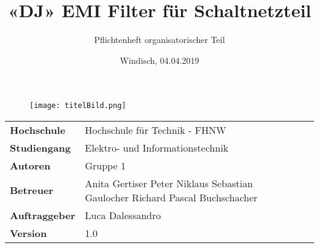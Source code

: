 \documentclass[final]{fhnwreport}       %
\title{«DJ» EMI Filter für Schaltnetzteil}          			%
\author{Pflichtenheft organisatorischer Teil}   %
\date{Windisch, 04.04.2019}             		%
\begin{document}
\maketitle

\vspace*{-1cm}						    %
\vfill
\begin{figure}[H]
\centering
\texttt{[image: titelBild.png]}
\end{figure}
\vfill

{
\renewcommand\arraystretch{2}
\begin{center}
\begin{tabular}{ >{\bf} l p{10cm} l }
Hochschule&Hochschule für Technik - FHNW\\
Studiengang&Elektro- und Informationstechnik\\
Autoren&Gruppe 1\\
Betreuer&Anita Gertiser \newline Peter Niklaus \newline Sebastian Gaulocher \newline  Richard \newline Pascal Buchschacher \newline \\
Auftraggeber&Luca Dalessandro\\
Version&1.0 %
\end{tabular}
\end{center}
}

\clearpage

\thispagestyle{empty}
			
\tableofcontents
\clearpage









{\sloppypar
{}	
\setlength{\bibitemsep}{\baselineskip}
\printbibliography[heading=bibintoc]
\label{sec:lit}
}

{%
}
\end{document}
